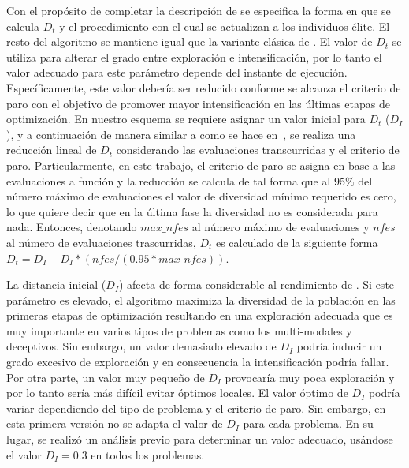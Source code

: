 Con el propósito de completar la descripción de \DEEDM{} se especifica la forma en que se calcula $D_t$ y el procedimiento con el cual se actualizan a los individuos élite.
%
El resto del algoritmo se mantiene igual que la variante clásica de \DE{}.
%
El valor de $D_t$ se utiliza para alterar el grado entre exploración e intensificación, por lo tanto el valor adecuado para este parámetro depende del
instante de ejecución.
%
Específicamente, este valor debería ser reducido conforme se alcanza el criterio de paro con el objetivo de promover mayor intensificación 
en las últimas etapas de optimización.
%
En nuestro esquema se requiere asignar un valor inicial para $D_t$ ($D_I$), y a continuación de manera similar a como se hace en~\cite{segura2016novel}, 
se realiza una reducción lineal de $D_t$ considerando las evaluaciones transcurridas y el criterio de paro.
%
Particularmente, en este trabajo, el criterio de paro se asigna en base a las evaluaciones a función
y la reducción se calcula de tal forma que al $95\%$ del número máximo de evaluaciones el valor de diversidad mínimo requerido es cero,
lo que quiere decir que en la última fase la diversidad no es considerada para nada.
%
Entonces, denotando $max\_nfes$ al número máximo de evaluaciones y $nfes$ al número de evaluaciones trascurridas, $D_t$ es calculado de la siguiente 
forma $D_t=D_I - D_I *(nfes/(0.95*max\_nfes))$.

La distancia inicial ($D_I$) afecta de forma considerable al rendimiento de \DEEDM{}.
%
Si este parámetro es elevado, el algoritmo maximiza la diversidad de la población en las primeras etapas de optimización resultando en una exploración adecuada 
que es muy importante en varios tipos de problemas como los multi-modales y deceptivos.
%
Sin embargo, un valor demasiado elevado de $D_I$ podría inducir un grado excesivo de exploración y en consecuencia la intensificación podría fallar.
%
Por otra parte, un valor muy pequeño de $D_I$ provocaría muy poca exploración y por lo tanto sería más difícil evitar óptimos locales.
%
El valor óptimo de $D_I$ podría variar dependiendo del tipo de problema y el criterio de paro. %
%
Sin embargo, en esta primera versión no se adapta el valor de $D_I$ para cada problema.
%
En su lugar, se realizó un análisis previo para determinar un valor adecuado, usándose el valor $D_I = 0.3$ en todos los 
problemas.

